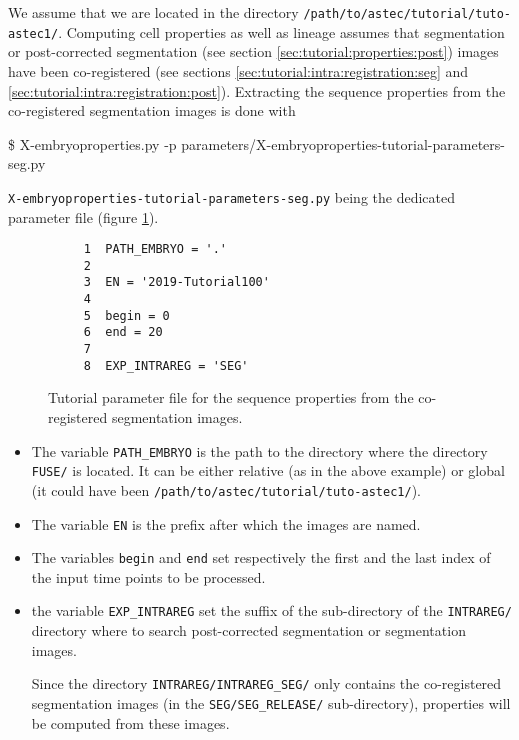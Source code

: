 We assume that we are located in the directory
\texttt{/path/to/astec/tutorial/tuto-astec1/}.
Computing cell properties as well as lineage assumes that
 segmentation or post-corrected segmentation (see section
\ref{sec:tutorial:properties:post}) images have been
co-registered (see sections \ref{sec:tutorial:intra:registration:seg}
and \ref{sec:tutorial:intra:registration:post}). 
Extracting the sequence properties from the co-registered segmentation
images is
done with
\begin{code}{0.8}
  \$ X-embryoproperties.py -p parameters/X-embryoproperties-tutorial-parameters-seg.py
\end{code}
\texttt{X-embryoproperties-tutorial-parameters-seg.py} being the
dedicated parameter file  (figure \ref{fig:tutorial:parameter:properties:seg}).

\begin{figure}
\begin{framed}
\begin{verbatim}
     1	PATH_EMBRYO = '.'
     2	
     3	EN = '2019-Tutorial100'
     4	
     5	begin = 0
     6	end = 20
     7	
     8	EXP_INTRAREG = 'SEG'
\end{verbatim}
\end{framed}
\caption{\label{fig:tutorial:parameter:properties:seg} Tutorial
  parameter file for the sequence properties from the co-registered
  segmentation images.}
\end{figure}

\begin{itemize}
  \itemsep -1ex
  \item The variable \texttt{PATH\_EMBRYO} is the path to the directory where
    the directory \texttt{FUSE/} is located. It can be either relative (as in the
    above example) or
    global (it could have been \texttt{/path/to/astec/tutorial/tuto-astec1/}).
  \item The variable \texttt{EN} is the prefix after which the  images
    are named. 
  \item The variables \texttt{begin} and \texttt{end} set respectively the
    first and the last index of the input time points to be processed.
  \item  the variable \texttt{EXP\_INTRAREG} set the suffix of the
    sub-directory of the \texttt{INTRAREG/} directory where to search
    post-corrected segmentation or segmentation images.

    Since the directory \texttt{INTRAREG/INTRAREG\_SEG/}  only
    contains the co-registered segmentation images (in the
    \texttt{SEG/SEG\_RELEASE/} sub-directory), properties will be computed from
    these images.
\end{itemize}

